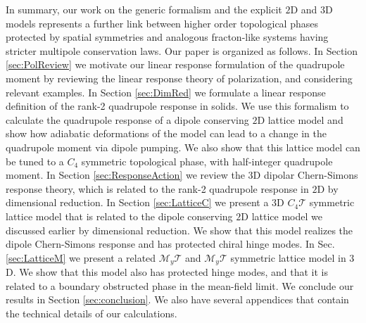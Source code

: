 \documentclass[prb,aps,twocolumn,groupaddress,floatfix]{revtex4-1}
\begin{document}
In summary, our work on the generic formalism and the explicit $2$D and $3$D models represents a further link between higher order topological phases protected by spatial symmetries and analogous fracton-like systems having stricter multipole conservation laws. Our paper is organized as follows. In Section \ref{sec:PolReview} we motivate our linear response formulation of the quadrupole moment by reviewing the linear response theory of polarization, and considering relevant examples. In Section \ref{sec:DimRed} we formulate a linear response definition of the rank-2 quadrupole response in solids. We use this formalism to calculate the quadrupole response of a dipole conserving $2$D lattice model and show how adiabatic deformations of the model can lead to a change in the quadrupole moment via dipole pumping. We also show that this lattice model can be tuned to a $C_4$ symmetric topological phase, with half-integer quadrupole moment. In Section \ref{sec:ResponseAction} we review the $3$D dipolar Chern-Simons response theory, which is related to the rank-2 quadrupole response in $2$D by dimensional reduction. In Section \ref{sec:LatticeC} we present a $3$D $C_4\mathcal{T}$ symmetric lattice model that is related to the dipole conserving $2$D lattice model we discussed earlier by dimensional reduction. We show that this model realizes the dipole Chern-Simons response and has  protected chiral hinge modes. In Sec. \ref{sec:LatticeM} we present a related $\mathcal{M}_y\mathcal{T}$ and $\mathcal{M}_y\mathcal{T}$ symmetric lattice model in $3$D. We show that this model also has protected hinge modes, and that it is  related to a boundary obstructed phase in the mean-field limit. We conclude our results in Section \ref{sec:conclusion}. We also have several appendices that contain the technical details of our calculations.
\end{document}

